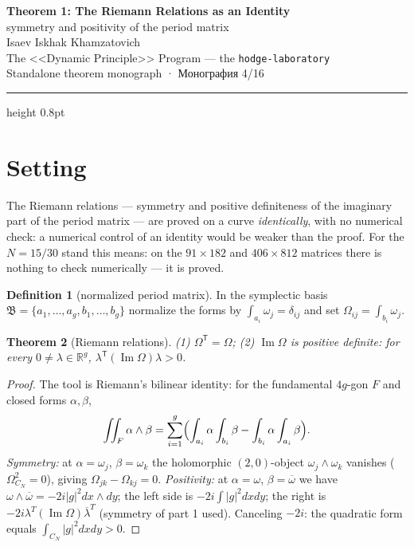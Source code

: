 \documentclass[11pt,a4paper]{article}
\theoremstyle{plain}
\newtheorem{theorem}{Theorem}
\theoremstyle{definition}
\newtheorem{definition}[theorem]{Definition}
\theoremstyle{remark}
\newcommand{\RR}{\mathbb{R}}
\newcommand{\im}{\operatorname{Im}}
\begin{document}
\begin{center}
{\LARGE\bfseries Theorem 1: The Riemann Relations as an Identity}\\[0.4em]
{\large symmetry and positivity of the period matrix}\\[0.6em]
{\normalsize Isaev Iskhak Khamzatovich}\\[0.2em]
{\normalsize The <<Dynamic Principle>> Program --- the \texttt{hodge-laboratory}}\\[0.15em]
{\small Standalone theorem monograph · Монография 4/16}
\end{center}
\vspace{0.4em}
{\color{linkblue}\hrule height 0.8pt}
\vspace{0.8em}

\section{Setting}

The Riemann relations --- symmetry and positive definiteness of the
imaginary part of the period matrix --- are proved on a curve
\emph{identically}, with no numerical check: a numerical control of
an identity would be weaker than the proof. For the $N=15/30$ stand
this means: on the $91\times182$ and $406\times812$ matrices there
is nothing to check numerically --- it is proved.

\begin{definition}[normalized period matrix]
In the symplectic basis
$\mathfrak{B}=\{a_1,\dots,a_g,b_1,\dots,b_g\}$ normalize the forms by
$\int_{a_i}\omega_j=\delta_{ij}$ and set
$\Omega_{ij}=\int_{b_i}\omega_j$.
\end{definition}

\begin{theorem}[Riemann relations]\label{th:riemann}
(1) $\Omega^{\mathsf{T}}=\Omega$; (2) $\im\Omega$ is positive
definite: for every $0\ne\lambda\in\RR^g$,
$\lambda^{\mathsf{T}}(\im\Omega)\lambda>0$.
\end{theorem}

\begin{proof}
The tool is Riemann's bilinear identity: for the fundamental
$4g$-gon $F$ and closed forms $\alpha,\beta$,
\[
  \iint_F \alpha\wedge\beta
  =\sum_{i=1}^{g}\Bigl(
    \int_{a_i}\alpha\int_{b_i}\beta
    -\int_{b_i}\alpha\int_{a_i}\beta\Bigr).
\]
\emph{Symmetry:} at $\alpha=\omega_j$, $\beta=\omega_k$ the
holomorphic $(2,0)$-object $\omega_j\wedge\omega_k$ vanishes
($\Omega^2_{C_N}=0$), giving $\Omega_{jk}-\Omega_{kj}=0$.
\emph{Positivity:} at $\alpha=\omega$, $\beta=\overline{\omega}$ we
have $\omega\wedge\overline{\omega}=-2i|g|^2dx\wedge dy$; the left
side is $-2i\int|g|^2dxdy$; the right is
$-2i\lambda^T(\im\Omega)\overline{\lambda}^T$ (symmetry of part 1
used). Canceling $-2i$: the quadratic form equals
$\int_{C_N}|g|^2dxdy>0$.
\end{proof}
\end{document}
